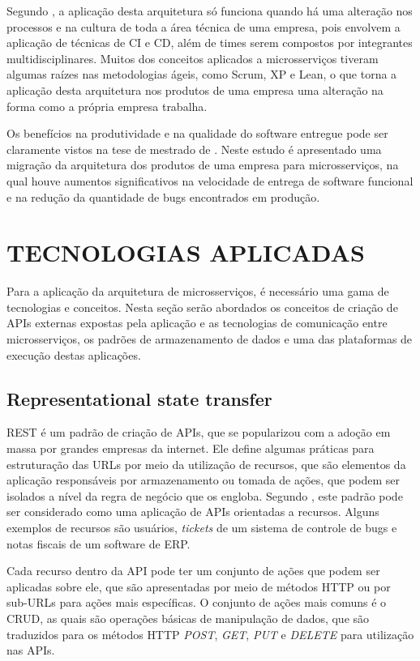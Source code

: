 Segundo , a aplicação desta arquitetura só funciona
quando há uma alteração nos processos e na cultura de toda a área técnica
de uma empresa, pois envolvem a aplicação de técnicas de \ac{CI} e \ac{CD},
além de times serem compostos por integrantes multidisciplinares. Muitos dos
conceitos aplicados a microsserviços tiveram algumas raízes nas metodologias
ágeis, como Scrum, XP e Lean, o que torna a aplicação desta arquitetura nos
produtos de uma empresa uma alteração na forma como a própria empresa trabalha.

Os benefícios na produtividade e na qualidade do software entregue pode
ser claramente vistos na tese de mestrado de . Neste
estudo é apresentado uma migração da arquitetura dos produtos de uma empresa
para microsserviços, na qual houve aumentos significativos na velocidade de
entrega de software funcional e na redução da quantidade de bugs encontrados
em produção.

\section{TECNOLOGIAS APLICADAS}

Para a aplicação da arquitetura de microsserviços, é necessário uma gama de
tecnologias e conceitos. Nesta seção serão abordados os conceitos de criação
de APIs externas expostas pela aplicação e as tecnologias de comunicação entre
microsserviços, os padrões de armazenamento de dados e uma das plataformas de
execução destas aplicações.

\subsection{Representational state transfer}

\ac{REST} é um padrão de criação de \acp{API}, que se popularizou com a
adoção em massa por grandes empresas da internet. Ele define algumas práticas
para estruturação das \acp{URL} por meio da utilização de recursos, que são
elementos da aplicação responsáveis por armazenamento ou tomada de ações, que
podem ser isolados a nível da regra de negócio que os engloba. Segundo
, este padrão pode ser considerado como uma aplicação
de \acp{API} orientadas a recursos. Alguns exemplos de recursos são usuários,
\emph{tickets} de um sistema de controle de bugs e notas fiscais de um
software de \ac{ERP}.

Cada recurso dentro da \ac{API} pode ter um conjunto de ações que podem ser
aplicadas sobre ele, que são apresentadas por meio de métodos \ac{HTTP} ou
por sub-\acp{URL} para ações mais específicas. O conjunto de ações mais
comuns é o \ac{CRUD}, as quais são operações básicas de manipulação de dados,
que são traduzidos para os métodos \ac{HTTP} \emph{POST}, \emph{GET},
\emph{PUT} e \emph{DELETE} para utilização nas \acp{API}.

